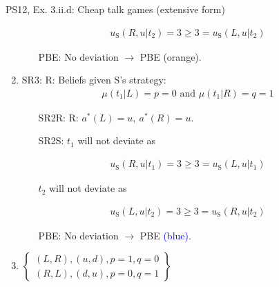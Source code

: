 \begin{frame}{PS12, Ex. 3.ii.d: Cheap talk games (extensive form)}
\begin{multicols}{2}
\begin{enumerate}
\begin{itemize}
        \end{itemize}\vspace{-10pt}
        \begin{align*}
          u_\text{S}(R,u|t_2)=3\geq3=u_\text{S}(L,u|t_2)
        \end{align*}\vspace{-18pt}
        \begin{itemize}\normalsize
          \item[PBE:] No deviation $\rightarrow$ PBE \textcolor{YellowOrange}{(orange)}.
        \end{itemize}
        \item SR3: R: Beliefs given S's strategy:\vspace{-8pt}
        \begin{align*}
          \mu(t_1|L)=p=0\text{ and }\mu(t_1|R)=q=1
        \end{align*}\vspace{-18pt}
        \begin{itemize}\normalsize
          \item[SR2R:] R: $a^*(L)=u,\ a^*(R)=u$.
          \item[SR2S:] $t_1$ will not deviate as
        \end{itemize}\vspace{-10pt}
        \begin{align*}
          u_\text{S}(R,u|t_1)=3\geq 3=u_\text{S}(L,u|t_1)
        \end{align*}\vspace{-18pt}
        \begin{itemize}\normalsize
          \item[] $t_2$ will not deviate as
        \end{itemize}\vspace{-10pt}
        \begin{align*}
          u_\text{S}(L,u|t_2)=3\geq3=u_\text{S}(R,u|t_2)
        \end{align*}\vspace{-18pt}
        \begin{itemize}\normalsize
          \item[PBE:] No deviation $\rightarrow$ PBE \textcolor{blue}{(blue)}.
        \end{itemize}
        \item $\left\{\begin{array}{c}
            (L,R),(u,d),p=1,q=0\\
            (R,L),(d,u),p=0,q=1\end{array}\right\}$
      \end{enumerate}
      \vfill\null
    \end{multicols}
\end{frame}
